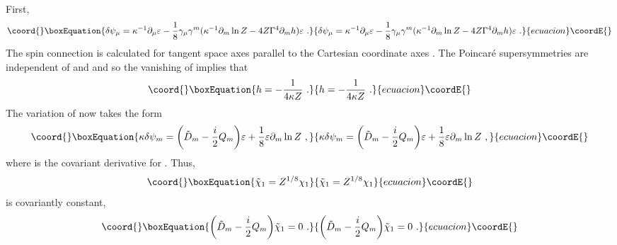 \documentclass[a4paper,12pt]{article}
\renewcommand{\=}[1]{\bar{#1}}
\begin{document}
First,
\begin{equation}\coord{}\boxEquation{
\delta \psi_\mu = \kappa^{-1} \partial_\mu \varepsilon -
\frac{1}{8}
\gamma_\mu \gamma^m (\kappa^{-1} \partial_m \ln Z - 4Z \Gamma^4 \partial_m h)
\varepsilon
\ . \label{dpmu}
}{
\delta \psi_\mu = \kappa^{-1} \partial_\mu \varepsilon -
\frac{1}{8}
\gamma_\mu \gamma^m (\kappa^{-1} \partial_m \ln Z - 4Z \Gamma^4 \partial_m h)
\varepsilon
\ . }{ecuacion}\coordE{}\end{equation}
The spin connection is calculated for tangent space axes \coordHE{}
parallel to the Cartesian coordinate axes \coordHE{}.
The Poincar\'e supersymmetries are independent of \coordHE{} and
and so the vanishing of \myHighlight{$\delta \psi_\mu$}\coordHE{} implies that
\begin{equation}\coord{}\boxEquation{
h = -\frac{1}{4 \kappa Z}\ .
}{
h = -\frac{1}{4 \kappa Z}\ .
}{ecuacion}\coordE{}\end{equation}
The variation of \coordHE{} now takes the form
\begin{equation}\coord{}\boxEquation{
\kappa \delta \psi_m = \biggl(\tilde D_{m} -{i\over2} Q_m \biggr) \varepsilon
+ \frac{1}{8}\varepsilon
\partial_m \ln Z \ , \label{dpm}
}{
\kappa \delta \psi_m = \biggl(\tilde D_{m} -{i\over2} Q_m \biggr) \varepsilon
+ \frac{1}{8}\varepsilon
\partial_m \ln Z \ , }{ecuacion}\coordE{}\end{equation}
where \coordHE{} is the covariant derivative for \coordHE{}.
Thus,
\begin{equation}\coord{}\boxEquation{
\tilde \chi_1 = Z^{1/8} \chi_1
\label{chi}
}{
\tilde \chi_1 = Z^{1/8} \chi_1
}{ecuacion}\coordE{}\end{equation}
is covariantly constant,
\begin{equation}\coord{}\boxEquation{
\biggl(\tilde D_{m} -{i\over2} Q_m \biggr) \tilde\chi_1 = 0 \ . \label{cocon}
}{
\biggl(\tilde D_{m} -{i\over2} Q_m \biggr) \tilde\chi_1 = 0 \ . }{ecuacion}\coordE{}\end{equation}
\end{document}
